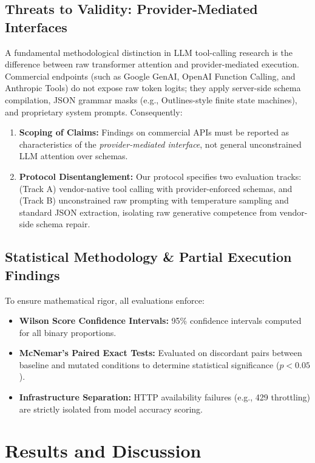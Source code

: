 \documentclass[10pt,conference]{IEEEtran}
\begin{document}
\subsection{Threats to Validity: Provider-Mediated Interfaces}
A fundamental methodological distinction in LLM tool-calling research is the difference between raw transformer attention and provider-mediated execution. Commercial endpoints (such as Google GenAI, OpenAI Function Calling, and Anthropic Tools) do not expose raw token logits; they apply server-side schema compilation, JSON grammar masks (e.g., Outlines-style finite state machines), and proprietary system prompts. Consequently:
\begin{enumerate}
    \item \textbf{Scoping of Claims:} Findings on commercial APIs must be reported as characteristics of the \emph{provider-mediated interface}, not general unconstrained LLM attention over schemas.
    \item \textbf{Protocol Disentanglement:} Our protocol specifies two evaluation tracks: (Track A) vendor-native tool calling with provider-enforced schemas, and (Track B) unconstrained raw prompting with temperature sampling and standard JSON extraction, isolating raw generative competence from vendor-side schema repair.
\end{enumerate}

\subsection{Statistical Methodology \& Partial Execution Findings}
To ensure mathematical rigor, all evaluations enforce:
\begin{itemize}
    \item \textbf{Wilson Score Confidence Intervals:} 95\% confidence intervals computed for all binary proportions.
    \item \textbf{McNemar's Paired Exact Tests:} Evaluated on discordant pairs between baseline and mutated conditions to determine statistical significance ($p < 0.05$).
    \item \textbf{Infrastructure Separation:} HTTP availability failures (e.g., 429 throttling) are strictly isolated from model accuracy scoring.
\end{itemize}



\section{Results and Discussion}
\end{document}
